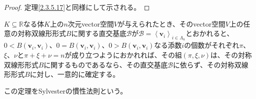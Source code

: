 \documentclass[dvipdfmx]{jsarticle}
\begin{document}
\begin{proof} 定理\ref{2.3.5.17}と同様にして示される。
\end{proof}
\begin{thm}[Sylvesterの慣性法則]\label{2.3.5.19}
$K \subseteq \mathbb{R}$なる体$K$上の$n$次元vector空間$V$が与えられたとき、そのvector空間$V$上の任意の対称双線形形式$B$に関する直交基底$\mathcal{B}$が$\mathcal{B} =\left\langle \mathbf{v}_{i} \right\rangle_{i \in \varLambda_{n}}$とおかれると、$0 < B\left( \mathbf{v}_{i},\mathbf{v}_{i} \right)$、$0 = B\left( \mathbf{v}_{i},\mathbf{v}_{i} \right)$、$0 > B\left( \mathbf{v}_{i},\mathbf{v}_{i} \right)$なる添数$i$の個数がそれぞれ$\pi$、$\xi$、$\nu$と$\pi + \xi + \nu = n$が成り立つようにおかれれば、その組$(\pi,\xi,\nu)$は、その対称双線形形式$B$に関するものであるなら、その直交基底$\mathcal{B}$に依らず、その対称双線形形式$B$に対し、一意的に確定する。\par
この定理をSylvesterの慣性法則という。
\end{thm}
\end{document}
